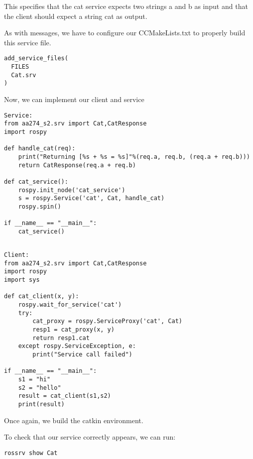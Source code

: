 This specifies that the cat service expects two strings a and b as input and that the client should expect a string cat as output. 

As with messages, we have to configure our CCMakeLists.txt to properly build this service file. 

\begin{tcolorbox}
\begin{lstlisting}
add_service_files(
  FILES
  Cat.srv
)
\end{lstlisting}
\end{tcolorbox}



Now, we can implement our client and service 

\begin{tcolorbox}
\begin{lstlisting}
Service:
from aa274_s2.srv import Cat,CatResponse
import rospy

def handle_cat(req):
    print("Returning [%s + %s = %s]"%(req.a, req.b, (req.a + req.b)))
    return CatResponse(req.a + req.b)

def cat_service():
    rospy.init_node('cat_service')
    s = rospy.Service('cat', Cat, handle_cat)
    rospy.spin()

if __name__ == "__main__":
    cat_service()
 
 \end{lstlisting}
\end{tcolorbox}


\begin{tcolorbox}
\begin{lstlisting}
Client:
from aa274_s2.srv import Cat,CatResponse
import rospy
import sys

def cat_client(x, y):
    rospy.wait_for_service('cat')
    try:
        cat_proxy = rospy.ServiceProxy('cat', Cat)
        resp1 = cat_proxy(x, y)
        return resp1.cat
    except rospy.ServiceException, e:
        print("Service call failed")

if __name__ == "__main__":
	s1 = "hi"
	s2 = "hello"
	result = cat_client(s1,s2)
	print(result)
 \end{lstlisting}
\end{tcolorbox}

Once again, we build the catkin environment.

To check that our service correctly appears, we can run:

\begin{tcolorbox}
\begin{lstlisting}
rossrv show Cat
\end{lstlisting}	
\end{tcolorbox}


